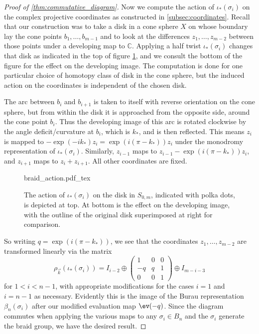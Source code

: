 \documentclass{amsart}
\begin{document}
\begin{proof}[Proof of \cref{thm:commutative_diagram}]
        Now we compute the action of $\iota_*(\sigma_i)$ on the complex projective coordinates as constructed in \cref{subsec:coordinates}. Recall that our construction was to take a disk in a cone sphere $X$ on whose boundary lay the cone points $b_1,\dotsc,b_{m-1}$ and to look at the differences $z_1,\dotsc,z_{m-2}$ between those points under a developing map to $\mathbb C$. Applying a half twist $\iota_*(\sigma_i)$ changes that disk as indicated in the top of figure \cref{fig:polyhedra_computation}, and we consult the bottom of the figure for the effect on the developing image. The computation is done for one particular choice of homotopy class of disk in the cone sphere, but the induced action on the coordinates is independent of the chosen disk.
        
        The arc between $b_i$ and $b_{i+1}$ is taken to itself with reverse orientation on the cone sphere, but from within the disk it is approached from the opposite side, around the cone point $b_i$. Thus the developing image of this arc is rotated clockwise by the angle deficit/curvature at $b_i$, which is $k_*$, and is then reflected. This means $z_i$ is mapped to $-\exp(-ik_*)z_i = \exp(i(\pi-k_*))z_i$ under the monodromy representation of $\iota_*(\sigma_i)$. Similarly, $z_{i-1}$ maps to $z_{i-1}-\exp(i(\pi-k_*))z_i$, and $z_{i+1}$ maps to $z_i+z_{i+1}$. All other coordinates are fixed.
        
        \begin{figure}
            \centering
            \def\svgwidth{.7\columnwidth}
            {braid_action.pdf_tex}
            \caption{The action of $\iota_*(\sigma_i)$ on the disk in $S_{0,m}$, indicated with polka dots, is depicted at top. At bottom is the effect on the developing image, with the outline of the original disk superimposed at right for comparison.}
            \label{fig:polyhedra_computation}
        \end{figure}
    
        So writing $q=\exp(i(\pi-k_*))$, we see that the coordinates $z_1,\dotsc,z_{m-2}$ are transformed linearly via the matrix
        \begin{equation*}
            \rho_{\vec k}(\iota_*(\sigma_i)) = I_{i-2} \oplus \begin{pmatrix}
                1 & 0 & 0 \\
                -q & q & 1\\
                0 & 0 & 1
            \end{pmatrix}
            \oplus I_{m-i-3}
        \end{equation*}
        for $1 < i < n-1$, with appropriate modifications for the cases $i=1$ and $i=n-1$ as necessary. Evidently this is the image of the Burau representation $\beta_n(\sigma_i)$ after our modified evaluation map $\ev(-q)$. Since the diagram commutes when applying the various maps to any $\sigma_i \in B_n$ and the $\sigma_i$ generate the braid group, we have the desired result.
    \end{proof}
\end{document}
